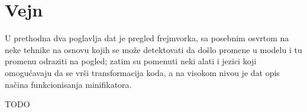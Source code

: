 \section{Vejn}

U prethodna dva poglavlja dat je pregled frejmvorka, sa posebnim osvrtom na neke tehnike na osnovu kojih se može detektovati da došlo promene u modelu i tu promenu odraziti na pogled; zatim su pomenuti neki alati i jezici koji omogućavaju da se vrši transformacija koda, a na visokom nivou je dat opis načina funkcionisanja minifikatora.

TODO
